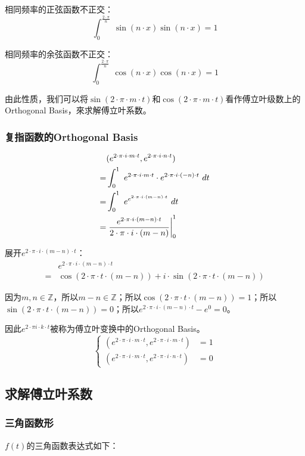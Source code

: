 相同频率的正弦函数不正交：
$$
	\int_0^{\frac{2\cdot \pi}{n}}\ \sin(n\cdot x)\sin(n\cdot x)=1
$$

相同频率的余弦函数不正交：
$$
	\int_0^{\frac{2\cdot \pi}{n}}\ \cos(n\cdot x)\cos(n\cdot x)=1
$$

由此性质，我们可以将$\sin(2\cdot \pi\cdot m \cdot t)$和$\cos(2\cdot \pi\cdot m \cdot t)$看作傅立叶级数上的Orthogonal Basis，來求解傅立叶系数。
\subsubsection{复指函数的Orthogonal Basis}
\begin{align*}
	  & (e^{2\cdot \pi\cdot i\cdot m\cdot t},e^{2\cdot \pi\cdot i\cdot n\cdot t})                      \\
	= & \int_0^1 \ e^{2\cdot \pi\cdot i\cdot m\cdot t}\cdot e^{2\cdot \pi\cdot i\cdot (-n)\cdot t}\ dt \\
	= & \int_0^1 \ e^{e^{2\cdot \pi\cdot i\cdot (m-n)\cdot t}}\ dt                                     \\
	= & \rsx{\frac{e^{2\cdot \pi\cdot i\cdot (m-n)\cdot t}}{2\cdot \pi \cdot i \cdot(m-n)}}_0^1
\end{align*}

展开$e^{2\cdot \pi\cdot i\cdot (m-n)\cdot t}$：
\begin{align*}
	  & e^{2\cdot \pi\cdot i\cdot (m-n)\cdot t}                                       \\
	= & \cos(2\cdot \pi \cdot t\cdot(m-n))+i \cdot \sin(2\cdot \pi \cdot t\cdot(m-n))
\end{align*}

因为$m,n\in \mathbb{Z}$，所以$m-n\in \mathbb{Z}$；所以$\cos(2\cdot \pi \cdot t\cdot(m-n))=1$；所以$\sin(2\cdot \pi \cdot t\cdot(m-n))=0$；所以$e^{2\cdot \pi\cdot i\cdot (m-n)\cdot t}-e^0=0$。

因此$e^{2\cdot \pi i\cdot k \cdot t}$被称为傅立叶变换中的Orthogonal Basis。
$$
	\begin{cases}
		(e^{2\cdot \pi\cdot i\cdot m\cdot t},e^{2\cdot \pi\cdot i\cdot m\cdot t}) & =1 \\
		(e^{2\cdot \pi\cdot i\cdot m\cdot t},e^{2\cdot \pi\cdot i\cdot n\cdot t}) & =0
	\end{cases}
$$
\subsection{求解傅立叶系数}
\subsubsection{三角函数形}
$f(t)$的三角函数表达式如下：

